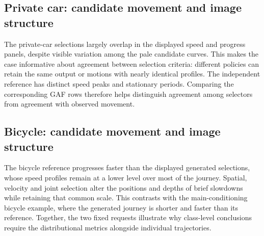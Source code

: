 \subsection{Private car: candidate movement and image structure}
The private-car selections largely overlap in the displayed speed and progress panels, despite visible variation among the pale candidate curves. This makes the case informative about agreement between selection criteria: different policies can retain the same output or motions with nearly identical profiles. The independent reference has distinct speed peaks and stationary periods. Comparing the corresponding GAF rows therefore helps distinguish agreement among selectors from agreement with observed movement.

\FloatBarrier

\subsection{Bicycle: candidate movement and image structure}
The bicycle reference progresses faster than the displayed generated selections, whose speed profiles remain at a lower level over most of the journey. Spatial, velocity and joint selection alter the positions and depths of brief slowdowns while retaining that common scale. This contrasts with the main-conditioning bicycle example, where the generated journey is shorter and faster than its reference. Together, the two fixed requests illustrate why class-level conclusions require the distributional metrics alongside individual trajectories.

\FloatBarrier

